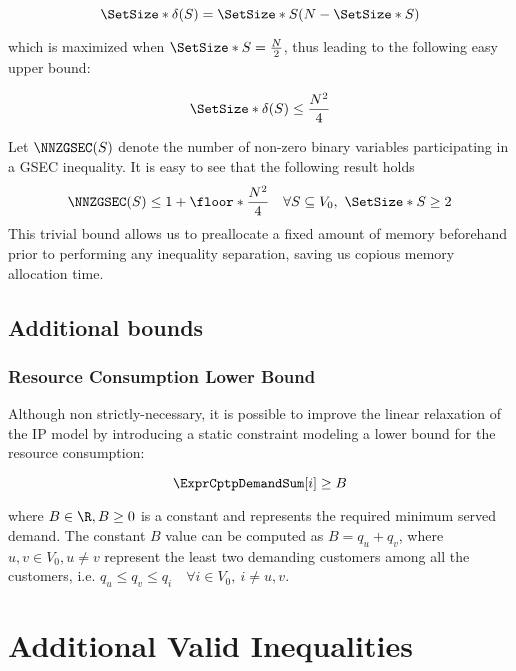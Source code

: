 \begin{equation}\label{eq:delta-s-set-size}
	\SetSize*{\delta(S)} = \SetSize*{S} (N - \SetSize*{S})
\end{equation}

which is maximized when $\SetSize*{S} = \frac{N}{2}$, thus leading to the following easy upper bound:

\begin{equation}\label{eq:delta-s-set-size-ub}
	\SetSize*{\delta(S)} \le \frac{N^2}{4}
\end{equation}

Let $\NNZGSEC(S)$ denote the number of non-zero binary variables participating in a GSEC inequality.
It is easy to see that the following result holds
\begin{equation}\label{eq:gsec-nnz-ub}
	\NNZGSEC(S) \le 1 + \floor*{\frac{N^2}{4}} \quad \forall S \subseteq V_0,\ \SetSize*{S} \ge 2
\end{equation}
This trivial bound allows us to preallocate a fixed amount of memory beforehand prior to performing any inequality separation, saving us copious memory allocation time.

\subsection{Additional bounds}

\subsubsection{Resource Consumption Lower Bound}\label{sec:demand-lower-bound}
Although non strictly-necessary,
it is possible to improve the linear relaxation of the IP model
by introducing a static constraint modeling a lower bound for the resource consumption:

\begin{equation}\label{eq:resource-lower-bound-constraint}
	\ExprCptpDemandSum[i]   \ge B
\end{equation}

where $B \in \R, B \ge 0$ is a constant and represents the required minimum served demand.
The constant $B$ value can be computed as $B = q_u + q_v$, where $u, v \in V_0, u \ne v$ represent the least two demanding customers among all the customers, i.e. $q_u \le q_v \le q_i \quad \forall i \in V_0,\ i \ne u, v$.

\section{Additional Valid Inequalities}\label{sec:additional-valid-inequalities}

